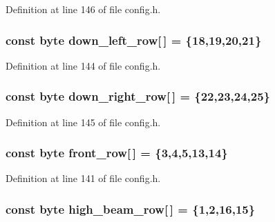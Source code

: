Definition at line 146 of file config.\+h.

\subsubsection[{\texorpdfstring{down\+\_\+left\+\_\+row}{down_left_row}}]{\setlength{\rightskip}{0pt plus 5cm}const byte down\+\_\+left\+\_\+row\mbox{[}$\,$\mbox{]} = \{18,19,20,21\}}\hypertarget{group__deployment_gaac36c9836edd3a125668213f0fb72b5a}{}\label{group__deployment_gaac36c9836edd3a125668213f0fb72b5a}


Definition at line 144 of file config.\+h.

\subsubsection[{\texorpdfstring{down\+\_\+right\+\_\+row}{down_right_row}}]{\setlength{\rightskip}{0pt plus 5cm}const byte down\+\_\+right\+\_\+row\mbox{[}$\,$\mbox{]} = \{22,23,24,25\}}\hypertarget{group__deployment_gadbf10ff9ee353128c568e07c32b1ffa9}{}\label{group__deployment_gadbf10ff9ee353128c568e07c32b1ffa9}


Definition at line 145 of file config.\+h.

\subsubsection[{\texorpdfstring{front\+\_\+row}{front_row}}]{\setlength{\rightskip}{0pt plus 5cm}const byte front\+\_\+row\mbox{[}$\,$\mbox{]} = \{3,4,5,13,14\}}\hypertarget{group__deployment_ga5009aa0cbe6b32a72b085489b027800e}{}\label{group__deployment_ga5009aa0cbe6b32a72b085489b027800e}


Definition at line 141 of file config.\+h.

\subsubsection[{\texorpdfstring{high\+\_\+beam\+\_\+row}{high_beam_row}}]{\setlength{\rightskip}{0pt plus 5cm}const byte high\+\_\+beam\+\_\+row\mbox{[}$\,$\mbox{]} = \{1,2,16,15\}}\hypertarget{group__deployment_ga1ecea646e1c5dcdfc643287a5f2041bb}{}\label{group__deployment_ga1ecea646e1c5dcdfc643287a5f2041bb}


